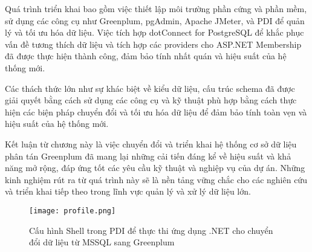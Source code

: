 Quá trình triển khai bao gồm việc thiết lập môi trường phần cứng và phần mềm, sử dụng các công cụ như Greenplum, pgAdmin, Apache JMeter, và PDI để quản lý và tối ưu hóa dữ liệu. Việc tích hợp dotConnect for PostgreSQL để khắc phục vấn đề tương thích dữ liệu và tích hợp các providers cho ASP.NET Membership đã được thực hiện thành công, đảm bảo tính nhất quán và hiệu suất của hệ thống mới.

Các thách thức lớn như sự khác biệt về kiểu dữ liệu, cấu trúc schema đã được giải quyết bằng cách sử dụng các công cụ và kỹ thuật phù hợp bằng cách thực hiện các biện pháp chuyển đổi và tối ưu hóa dữ liệu để đảm bảo tính toàn vẹn và hiệu suất của hệ thống mới.

Kết luận từ chương này là việc chuyển đổi và triển khai hệ thống cơ sở dữ liệu phân tán Greenplum đã mang lại những cải tiến đáng kể về hiệu suất và khả năng mở rộng, đáp ứng tốt các yêu cầu kỹ thuật và nghiệp vụ của dự án. Những kinh nghiệm rút ra từ quá trình này sẽ là nền tảng vững chắc cho các nghiên cứu và triển khai tiếp theo trong lĩnh vực quản lý và xử lý dữ liệu lớn.

\begin{figure}
    \centering
    \texttt{[image: profile.png]}
    \caption{Cấu hình Shell trong PDI để thực thi ứng dụng .NET cho chuyển đổi dữ liệu từ MSSQL sang Greenplum}
    \label{fig:aspnetProfile}
\end{figure}
